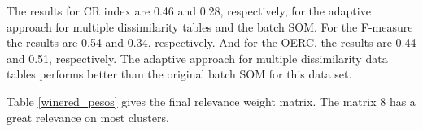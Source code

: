 \documentclass[10pt, conference, compsocconf]{IEEEtran}
\begin{document}
The results for CR index are 0.46 and 0.28, respectively, for the adaptive approach for multiple dissimilarity tables and the batch SOM. For the F-measure the results are 0.54 and 0.34, respectively. And for the OERC, the results are 0.44 and 0.51, respectively. The adaptive approach for multiple dissimilarity data tables performs better than the original batch SOM for this data set.

Table \ref{winered_pesos} gives the final relevance weight matrix. The matrix 8 has a great relevance on most clusters.

%
\end{document}
